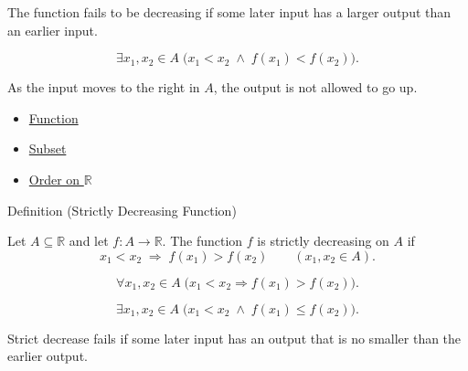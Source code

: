 \begin{remark*}
The function fails to be decreasing if some later input has a larger output
than an earlier input.
\end{remark*}

\begin{remark*}
\[
  \exists x_1,x_2\in A\;\bigl(x_1<x_2\;\wedge\;f(x_1)<f(x_2)\bigr).
\]
\end{remark*}

\begin{remark*}[Interpretation]
As the input moves to the right in $A$, the output is not allowed to go up.
\end{remark*}

\begin{dependencies}
\begin{itemize}
  \item \hyperref[def:function]{Function}
  \item \hyperref[def:subset]{Subset}
  \item \hyperref[def:order-on-r]{Order on $\mathbb{R}$}
\end{itemize}
\end{dependencies}

\begin{definitionbox}{Definition (Strictly Decreasing Function)}
\begin{definition}
\label{def:function-strictly-decreasing}
Let $A\subseteq\mathbb{R}$ and let $f:A\to\mathbb{R}$.  The function
$f$ is strictly decreasing on $A$ if
\[
  x_1<x_2\;\Longrightarrow\;f(x_1)>f(x_2)
  \qquad (x_1,x_2\in A).
\]
\end{definition}
\end{definitionbox}

\begin{remark*}
\[
  \forall x_1,x_2\in A\;\bigl(x_1<x_2\Rightarrow f(x_1)>f(x_2)\bigr).
\]
\end{remark*}

\begin{remark*}
\[
  \exists x_1,x_2\in A\;\bigl(x_1<x_2\;\wedge\;f(x_1)\leq f(x_2)\bigr).
\]
\end{remark*}

\begin{remark*}
Strict decrease fails if some later input has an output that is no smaller
than the earlier output.
\end{remark*}

